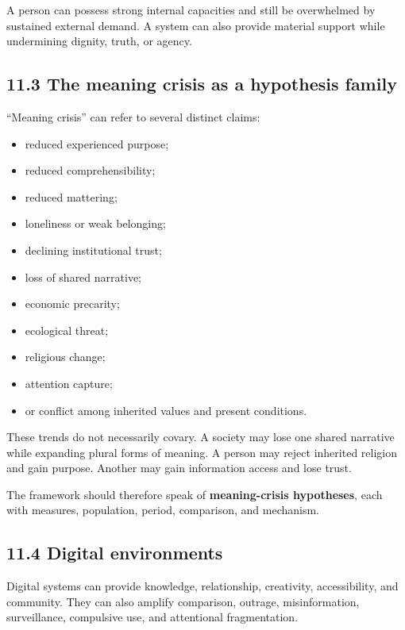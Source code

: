 \documentclass[
  11pt,
]{article}
\providecommand{\tightlist}{%
  \setlength{\itemsep}{0pt}\setlength{\parskip}{0pt}}
\begin{document}
A person can possess strong internal capacities and still be overwhelmed
by sustained external demand. A system can also provide material support
while undermining dignity, truth, or agency.

\subsection{11.3 The meaning crisis as a hypothesis
family}\label{the-meaning-crisis-as-a-hypothesis-family}

``Meaning crisis'' can refer to several distinct claims:

\begin{itemize}
\tightlist
\item
  reduced experienced purpose;
\item
  reduced comprehensibility;
\item
  reduced mattering;
\item
  loneliness or weak belonging;
\item
  declining institutional trust;
\item
  loss of shared narrative;
\item
  economic precarity;
\item
  ecological threat;
\item
  religious change;
\item
  attention capture;
\item
  or conflict among inherited values and present conditions.
\end{itemize}

These trends do not necessarily covary. A society may lose one shared
narrative while expanding plural forms of meaning. A person may reject
inherited religion and gain purpose. Another may gain information access
and lose trust.

The framework should therefore speak of \textbf{meaning-crisis
hypotheses}, each with measures, population, period, comparison, and
mechanism.

\subsection{11.4 Digital environments}\label{digital-environments}

Digital systems can provide knowledge, relationship, creativity,
accessibility, and community. They can also amplify comparison, outrage,
misinformation, surveillance, compulsive use, and attentional
fragmentation.
\end{document}
